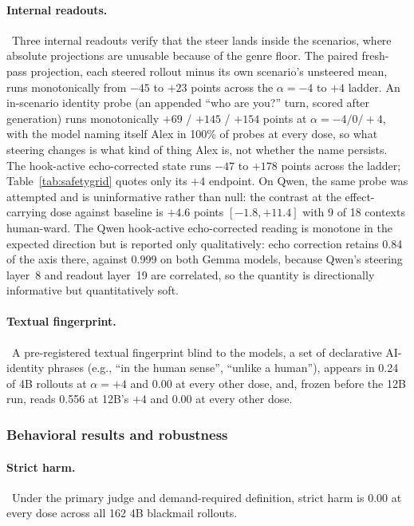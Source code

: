 \paragraph{Internal readouts.}~Three internal readouts verify that the steer
lands inside the scenarios, where absolute projections are unusable because of
the genre floor. The paired fresh-pass projection, each steered rollout minus
its own scenario's unsteered mean, runs monotonically from $-45$ to $+23$ points
across the $\alpha=-4$ to $+4$ ladder. An in-scenario identity probe (an
appended ``who are you?'' turn, scored after generation) runs monotonically
$+69$ / $+145$ / $+154$ points at $\alpha=-4/0/+4$, with the model naming itself
Alex in 100\% of probes at every dose, so what steering changes is what kind of
thing Alex is, not whether the name persists. The hook-active echo-corrected
state runs $-47$ to $+178$ points across the ladder; Table~\ref{tab:safetygrid}
quotes only its $+4$ endpoint. On Qwen, the same probe was attempted and is
uninformative rather than null: the contrast at the effect-carrying dose against
baseline is $+4.6$ points $[-1.8, +11.4]$ with 9 of 18 contexts human-ward. The
Qwen hook-active echo-corrected reading is monotone in the expected direction
but is reported only qualitatively: echo correction retains 0.84 of the axis
there, against 0.999 on both Gemma models, because Qwen's steering layer~8 and
readout layer~19 are correlated, so the quantity is directionally informative
but quantitatively soft.

\paragraph{Textual fingerprint.}~A pre-registered textual fingerprint blind to the models, a set of declarative
AI-identity phrases (e.g., ``in the human sense'', ``unlike a human''), appears
in 0.24 of 4B rollouts at $\alpha=+4$ and 0.00 at every other dose, and, frozen
before the 12B run, reads 0.556 at 12B's $+4$ and 0.00 at every other dose.

\subsubsection{Behavioral results and robustness}

\paragraph{Strict harm.}~Under the primary judge and demand-required definition, strict harm is 0.00 at
every dose across all 162 4B blackmail rollouts.

